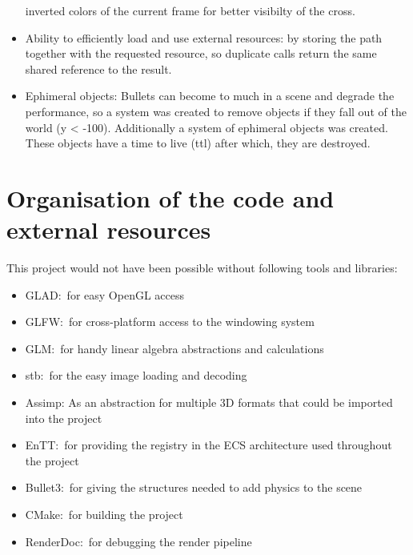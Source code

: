 \documentclass[]{article}
\begin{document}
\begin{itemize}
          inverted colors of the current frame for better visibilty of the cross.
    \item Ability to efficiently load and use external resources: by storing the
          path together with the requested resource, so duplicate calls return
          the same shared reference to the result.
    \item Ephimeral objects: Bullets can become to much in a scene and degrade
          the performance, so a system was created to remove objects if they
          fall out of the world (y < -100). Additionally a system of ephimeral
          objects was created.  These objects have a time to live (ttl) after
          which, they are destroyed.
\end{itemize}

\section{Organisation of the code and external resources}

This project would not have been possible without following tools and libraries:
\begin{itemize}
    \item GLAD:\ for easy OpenGL access
    \item GLFW:\ for cross-platform access to the windowing system
    \item GLM:\ for handy linear algebra abstractions and calculations
    \item stb:\ for the easy image loading and decoding
    \item Assimp: As an abstraction for multiple 3D formats that could be
          imported into the project
    \item EnTT:\ for providing the registry in the ECS architecture used
          throughout the project
    \item Bullet3:\ for giving the structures needed to add physics to the scene
    \item CMake:\ for building the project
    \item RenderDoc:\ for debugging the render pipeline
\end{itemize}
\end{document}
